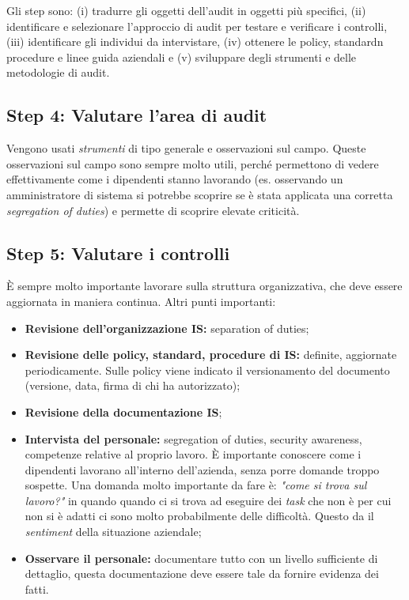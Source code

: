 Gli step sono: (i) tradurre gli oggetti dell'audit in oggetti più specifici, 
(ii) identificare e selezionare l'approccio di audit per testare e verificare i 
controlli, (iii) identificare gli individui da intervistare, (iv) ottenere le 
policy, standardn procedure e linee guida aziendali e (v) sviluppare degli 
strumenti e delle metodologie di audit.

\subsection{Step 4: Valutare l'area di audit}

Vengono usati \textit{strumenti} di tipo generale e osservazioni sul campo. 
Queste osservazioni sul campo sono sempre molto utili, perché permettono di 
vedere effettivamente come i dipendenti stanno lavorando (es. osservando 
un amministratore di sistema si potrebbe scoprire se è stata applicata una 
corretta \textit{segregation of duties}) e permette di scoprire elevate 
criticità.

\subsection{Step 5: Valutare i controlli}

È sempre molto importante lavorare sulla struttura organizzativa, che deve 
essere aggiornata in maniera continua.
Altri punti importanti:
\begin{itemize}
\item \textbf{Revisione dell'organizzazione IS:} separation of duties;
\item \textbf{Revisione delle policy, standard, procedure di IS:} definite, aggiornate 
periodicamente. Sulle policy viene indicato il versionamento del documento 
(versione, data, firma di chi ha autorizzato);
\item \textbf{Revisione della documentazione IS};
\item \textbf{Intervista del personale:} segregation of duties, security awareness, 
competenze relative al proprio lavoro. È importante conoscere come i dipendenti 
lavorano all'interno dell'azienda, senza porre domande troppo sospette. Una 
domanda molto importante da fare è: \textit{"come si trova sul lavoro?"} in 
quando quando ci si trova ad eseguire dei \textit{task} che non è per cui non 
si è adatti ci sono molto probabilmente delle difficoltà. Questo da il 
\textit{sentiment} della situazione aziendale;
\item \textbf{Osservare il personale:} documentare tutto con un livello 
sufficiente di dettaglio, questa documentazione deve essere tale 
da fornire evidenza dei fatti.
\end{itemize}


